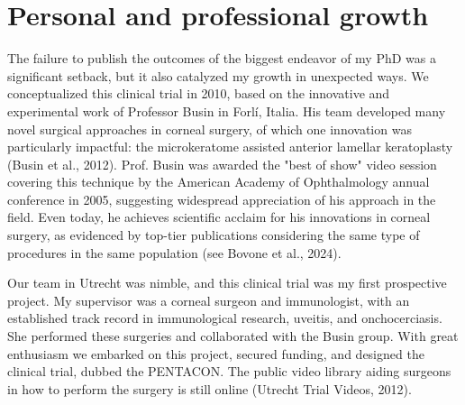 \documentclass[authordate, reflection,issue]{jote-new-article}
\author[1]{\mbox{Robert P. L. Wisse\orcid{0000-0002-2844-9868}}}
\affil[1]{University Medical Center, Utrecht, the Netherlands}
\begin{document}
\begin{frontmatter}
  \maketitle
  \begin{abstract}
    \printabstracttext
  \end{abstract}
\end{frontmatter}




	\section{Personal and professional growth}



	The failure to publish the outcomes of the biggest endeavor of my PhD was a significant setback, but it also catalyzed my growth in unexpected ways. We conceptualized this clinical trial in 2010, based on the innovative and experimental work of Professor Busin in Forlí, Italia. His team developed many novel surgical approaches in corneal surgery, of which one innovation was particularly impactful: the microkeratome assisted anterior lamellar keratoplasty (Busin et al., 2012). Prof. Busin was awarded the "best of show" video session covering this technique by the American Academy of Ophthalmology annual conference in 2005, suggesting widespread appreciation of his approach in the field. Even today, he achieves scientific acclaim for his innovations in corneal surgery, as evidenced by top-tier publications considering the same type of procedures in the same population (see Bovone et al., 2024).



	Our team in Utrecht was nimble, and this clinical trial was my first prospective project. My supervisor was a corneal surgeon and immunologist, with an established track record in immunological research, uveitis, and onchocerciasis. She performed these surgeries and collaborated with the Busin group. With great enthusiasm we embarked on this project, secured funding, and designed the clinical trial, dubbed the PENTACON. The public video library aiding surgeons in how to perform the surgery is still online (Utrecht Trial Videos, 2012).

\end{document}
